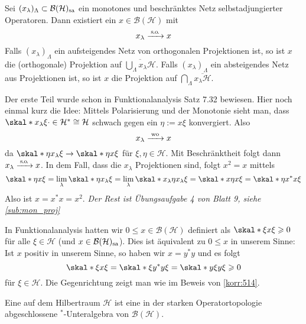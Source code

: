 \begin{satz}[label=satz:62,{name=[monotone Netze selbstadjungierter Operatoren]}]
	Sei $(x_\lambda)_\Lambda \subset \mathcal{B}(\mathcal{H})_{\mathrm{sa}}$ ein monotones und beschränktes Netz selbstadjungierter Operatoren.
	Dann existiert ein $x \in \mathcal{B}(\mathcal{H})$ mit 
	\[
		x_\lambda \grenzw{\so} x
	\]
	Falls $(x_\lambda)_\Lambda$ ein aufsteigendes Netz von orthogonalen Projektionen ist, so ist $x$ die (orthogonale) Projektion auf $\overline{\bigcup_{\Lambda} x_\lambda \mathcal{H}}$.
	Falls $(x_\lambda)_\Lambda$ ein absteigendes Netz aus Projektionen ist, so ist $x$ die Projektion auf $\bigcap_\Lambda\overline{x_\lambda \mathcal{H}}$.
\end{satz}
\begin{beweis}
	Der erste Teil wurde schon in Funktionalanalysis Satz 7.32 bewiesen. 
	Hier noch einmal kurz die Idee: 
	Mittels Polarisierung und der Monotonie sieht man, dass $\skal*{x_\lambda \xi}{\cdot} \in \mathcal{H}^*\cong \mathcal{H}$ schwach gegen ein $\eta:= x \xi$ konvergiert.
	Also
	\[
		x_\lambda \grenzw{\mathrm{wo}} x
	\]
	da $\skal*{\eta}{x_\lambda \xi} \to \skal*{\eta}{x \xi}$ für $\xi,\eta \in \mathcal{H}$. 
	Mit Beschränktheit folgt dann $x_\lambda \grenzw{\so} x$.
	In dem Fall, dass die $x_\lambda$ Projektionen sind, folgt $x^2=x$ mittels 
	\[
		\skal*{\eta}{x \xi} = \lim_\lambda \skal*{\eta}{x_\lambda \xi} = \lim_\lambda \skal*{x_\lambda \eta}{x_\lambda \xi} = \skal*{x \eta}{x \xi} = \skal*{\eta}{x^* x \xi}
	\]
	Also ist $x=x^*x=x^2$. \emph{Der Rest ist Übungsaufgabe 4 von Blatt 9, siehe \cref{sub:mon_proj}}
\end{beweis}

\begin{bemerkung}[{name=[verschiedene Definitionen von Positivität]}]
	In Funktionalanalysis hatten wir $0\le x \in \mathcal{B}(\mathcal{H})$ definiert als $\skal*{\xi}{x \xi} \ge 0$ für alle $\xi \in \mathcal{H}$ (und $x \in \mathcal{B}(\mathcal{H})_{\mathrm{sa}}$).
	Dies ist äquivalent zu $0\le x$ in unserem Sinne: 
	Ist $x$ positiv in unserem Sinne, so haben wir $x=y^*y$ und es folgt
	\[
		\skal*{\xi}{x \xi} = \skal*{\xi}{y^*y \xi} = \skal*{y \xi}{y \xi} \ge 0
	\]
	für $\xi \in \mathcal{H}$. 
	Die Gegenrichtung zeigt man wie im Beweis von \autoref{korr:514}.
\end{bemerkung}

\begin{definition}[{name=[von-Neumann-Algebra]}]
	Eine  auf dem Hilbertraum $\mathcal{H}$ ist eine in der starken Operatortopologie abgeschlossene $^*$-Unteralgebra von $\mathcal{B}(\mathcal{H})$.
\end{definition}


